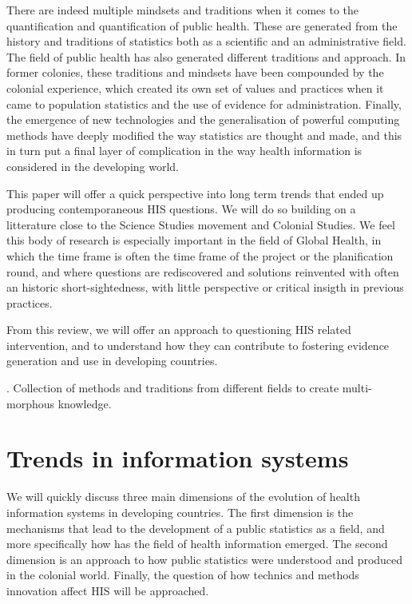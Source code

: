 \documentclass[letterpaper, 10 pt, conference]{ieeeconf}  %
\begin{document}
There are indeed multiple mindsets and traditions when it comes to the quantification and quantification of public health. These are generated from the history and traditions of statistics both as a scientific and an administrative field. The field of public health has also generated different traditions and approach. In former colonies, these traditions and mindsets have been compounded by the colonial experience, which created its own set of values and practices when it came to population statistics and the use of evidence for administration. Finally, the emergence of new technologies and the generalisation of powerful computing methods have deeply modified the way statistics are thought and made, and this in turn put a final layer of complication in the way health information is considered in the developing world.

This paper will offer a quick perspective into long term trends that ended up producing contemporaneous HIS questions. We will do so building on a litterature close to the Science Studies movement and Colonial Studies. We feel this body of research is especially important in the field of Global Health, in which the time frame is often the time frame of the project or the planification round, and where questions are rediscovered and solutions reinvented with often an historic short-sightedness, with little perspective or critical insigth in previous practices.

From this review, we will offer an approach to questioning HIS related intervention, and to understand how they can contribute to fostering evidence generation and use in developing countries.

\cite{vital_wave_consulting_health_2009}. Collection of methods and traditions from different fields to create multi-morphous knowledge. %

\section{Trends in information systems}

We will quickly discuss three main dimensions of the evolution of health information systems in developing countries. The first dimension is the mechanisms that lead to the development of a public statistics as a field, and more specifically how has the field of health information emerged. The second dimension is an approach to how public statistics were understood and produced in the colonial world. Finally, the question of how technics and methods innovation affect HIS will be approached.
\end{document}

